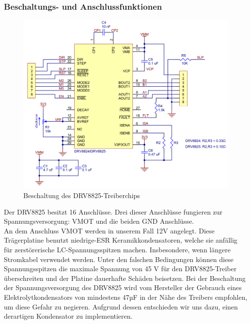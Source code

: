 \newpage

\subsubsection{Beschaltungs- und Anschlussfunktionen}

\begin{figure}[htb]
    \centering
    \includegraphics[scale=0.25]{fig/elektro/drv8825.png}
    \caption{Beschaltung des DRV8825-Treiberchips}
    \label{fig:Treiberchip}
\end{figure}

Der DRV8825 besitzt 16 Anschlüsse.
Drei dieser Anschlüsse fungieren zur Spannungsversorgung: VMOT und die beiden GND Anschlüsse. \\

An dem Anschluss VMOT werden in unserem Fall 12V angelegt.
Diese Trägerplatine benutzt niedrige-\acs{ESR} Keramikkondensatoren, welche sie anfällig für zerstörerische LC-Spannungsspitzen machen.
Insbesondere, wenn längere Stromkabel verwendet werden.
Unter den falschen Bedingungen können diese Spannungsspitzen die maximale Spannung von 45 V für den DRV8825-Treiber überschreiten und der Platine dauerhafte Schäden beisetzen.
Bei der Beschaltung der Spannungsversorgung des DRV8825 wird vom Hersteller der Gebrauch eines Elektrolytkondensators von mindestens 47µF in der Nähe des Treibers empfohlen, um diese Gefahr zu negieren.
Aufgrund dessen entschieden wir uns dazu, einen derartigen Kondensator zu implementieren.\\

